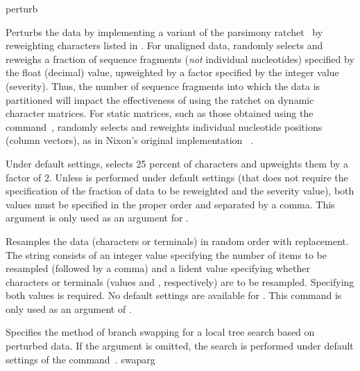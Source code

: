 \begin{command}{perturb}{}
\begin{arguments}
            {Perturbs the data by implementing a variant of the parsimony
            ratchet~\cite{Nixon1999} by reweighting characters listed in . 
            For unaligned data, randomly selects and reweighs a fraction of
            sequence fragments (\emph{not} individual nucleotides) specified
            by the float (decimal) value, upweighted by a factor specified by the integer
            value (severity). Thus, the number of sequence fragments into which the 
            data is partitioned will impact the effectiveness of using the ratchet on dynamic character matrices.  
            For static matrices, such as those obtained using the 
            command~, randomly selects and
            reweights individual nucleotide positions (column vectors), as in Nixon's
            original implementation ~\cite{Nixon1999}.
            
            Under default settings,
             selects 25 percent of characters and upweights
            them by a factor of 2.  Unless  is performed
            under default settings (that does not require the specification of the
            fraction of data to be reweighted and the severity value), both
            values must be specified in the proper order and separated by a comma.
            This argument is only used as an argument for .}
            {}

            {Resamples the data (characters or terminals) in random order with
            replacement. The  string consists of an 
            integer value
            specifying the number of items to be resampled (followed by a comma)
            and a lident value specifying whether characters or terminals
            (values  and , respectively)
            are to be resampled. Specifying both values
            is required. No default settings are available for . This
            command is only used as an argument of .}
            {}

            {Specifies the method of branch swapping for a local tree search
            based on perturbed data. If the argument 
            is omitted, the search is
            performed under default settings of the
            command~.}
            {swaparg}


\end{arguments}
\end{command}

